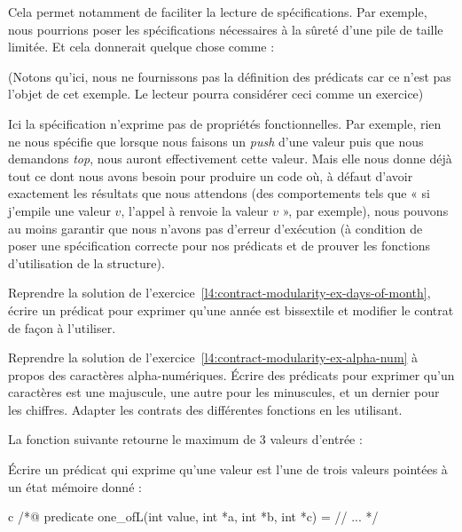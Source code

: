 Cela permet notamment de faciliter la lecture de spécifications. Par exemple, nous
pourrions poser les spécifications nécessaires à la sûreté d'une pile de taille
limitée. Et cela donnerait quelque chose comme :




(Notons qu'ici, nous ne fournissons pas la définition des prédicats car ce n'est
pas l'objet de cet exemple. Le lecteur pourra considérer ceci comme un exercice)

Ici la spécification n'exprime pas de propriétés fonctionnelles. Par exemple,
rien ne nous spécifie que lorsque nous faisons un \textit{push} d'une valeur puis que nous
demandons \textit{top}, nous auront effectivement cette valeur. Mais elle nous donne
déjà tout ce dont nous avons besoin pour produire un code où, à défaut d'avoir
exactement les résultats que nous attendons (des comportements tels que « si
j'empile une valeur $v$, l'appel à  renvoie la valeur $v$ », par exemple), nous
pouvons au moins garantir que nous n'avons pas d'erreur d'exécution (à condition
de poser une spécification correcte pour nos prédicats et de prouver les fonctions
d'utilisation de la structure).






Reprendre la solution de l'exercice~\ref{l4:contract-modularity-ex-days-of-month},
écrire un prédicat pour exprimer qu'une année est bissextile et modifier le contrat
de façon à l'utiliser.




Reprendre la solution de l'exercice~\ref{l4:contract-modularity-ex-alpha-num} à
propos des caractères alpha-numériques. Écrire des prédicats pour exprimer qu'un
caractères est une majuscule, une autre pour les minuscules, et un dernier pour les
chiffres. Adapter les contrats des différentes fonctions en les utilisant.




La fonction suivante retourne le maximum de 3 valeurs d'entrée :




Écrire un prédicat qui exprime qu'une valeur est l'une de trois valeurs pointées
à un état mémoire donné :


\begin{CodeBlock}{c}
  /*@
  predicate one_of{L}(int value, int *a, int *b, int *c) =
  // ...
  */
\end{CodeBlock}



